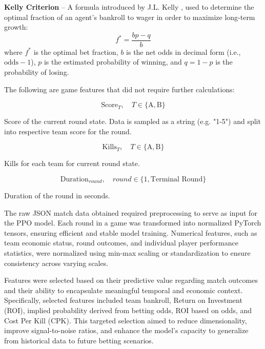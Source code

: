 \documentclass[sigconf]{acmart}
\begin{document}
\bigskip

\textbf{Kelly Criterion} – A formula introduced by J.L. Kelly \cite{kelly1956new}, used to determine the optimal fraction of an agent’s bankroll to wager in order to maximize long-term growth:
\begin{equation}
f^* = \frac{bp - q}{b}
\end{equation}
\noindent where \( f^* \) is the optimal bet fraction, \( b \) is the net odds in decimal form (i.e., \( \text{odds} - 1 \)), \( p \) is the estimated probability of winning, and \( q = 1 - p \) is the probability of losing.

\bigskip

The following are game features that did not require further calculations:

\begin{equation}
  \text{Score}_T, \quad T \in \{\text{A}, \text{B}\}
\end{equation}

Score of the current round state. Data is sampled as a string (e.g. "1-5") and split into respective team score for the round.

\smallskip

\begin{equation}
  \text{Kills}_{T}, \quad T \in \{\text{A}, \text{B}\}
\end{equation}

Kills for each team for current round state.

\smallskip

\begin{equation}
  \text{Duration}_{round}, \quad round \in \{1, \text{Terminal Round}\}
\end{equation}

Duration of the round in seconds.

\bigskip

The raw JSON match data obtained required preprocessing to serve as input for the PPO model. Each round in a game was transformed into normalized PyTorch tensors, ensuring efficient and stable model training. Numerical features, such as team economic status, round outcomes, and individual player performance statistics, were normalized using min-max scaling or standardization to ensure consistency across varying scales.

Features were selected based on their predictive value regarding match outcomes and their ability to encapsulate meaningful temporal and economic context. Specifically, selected features included team bankroll, Return on Investment (ROI), implied probability derived from betting odds, ROI based on odds, and Cost Per Kill (CPK). This targeted selection aimed to reduce dimensionality, improve signal-to-noise ratios, and enhance the model's capacity to generalize from historical data to future betting scenarios.
\end{document}
